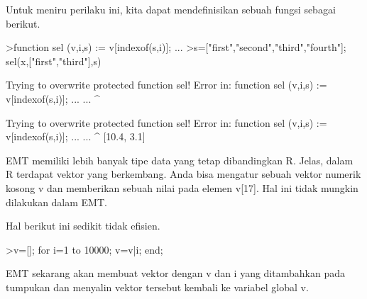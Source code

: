 \documentclass[12pt,arial,letterpaper]{book}
\begin{document}
\begin{eulernootebook}
\begin{eulercomment}
\begin{eulercomment}
\begin{eulernootebook}
\begin{eulercomment}
\begin{eulercomment}
\begin{eulercomment}
\begin{eulercomment}
\begin{eulercomment}
\begin{eulercomment}
\begin{eulercomment}
\begin{eulercomment}
\begin{eulercomment}
\begin{eulercomment}
\begin{eulercomment}
\begin{eulercomment}
Untuk meniru perilaku ini, kita dapat mendefinisikan sebuah fungsi
sebagai berikut.
\end{eulercomment}
\begin{eulerprompt}
>function sel (v,i,s) := v[indexof(s,i)]; ...
>s=["first","second","third","fourth"]; sel(x,["first","third"],s)
\end{eulerprompt}
\begin{euleroutput}
  
  Trying to overwrite protected function sel!
  Error in:
  function sel (v,i,s) := v[indexof(s,i)]; ... ...
               ^
  
  Trying to overwrite protected function sel!
  Error in:
  function sel (v,i,s) := v[indexof(s,i)]; ... ...
               ^
  [10.4,  3.1]
\end{euleroutput}
\begin{eulercomment}
EMT memiliki lebih banyak tipe data yang tetap dibandingkan R. Jelas,
dalam R terdapat vektor yang berkembang. Anda bisa mengatur sebuah
vektor numerik kosong v dan memberikan sebuah nilai pada elemen v[17].
Hal ini tidak mungkin dilakukan dalam EMT.

Hal berikut ini sedikit tidak efisien.
\end{eulercomment}
\begin{eulerprompt}
>v=[]; for i=1 to 10000; v=v|i; end;
\end{eulerprompt}
\begin{eulercomment}
EMT sekarang akan membuat vektor dengan v dan i yang ditambahkan pada
tumpukan dan menyalin vektor tersebut kembali ke variabel global v.


\end{eulercomment}
\end{eulercomment}
\end{eulercomment}
\end{eulercomment}
\end{eulercomment}
\end{eulercomment}
\end{eulercomment}
\end{eulercomment}
\end{eulercomment}
\end{eulercomment}
\end{eulercomment}
\end{eulercomment}
\end{eulernootebook}
\end{eulercomment}
\end{eulercomment}
\end{eulernootebook}
\end{document}
